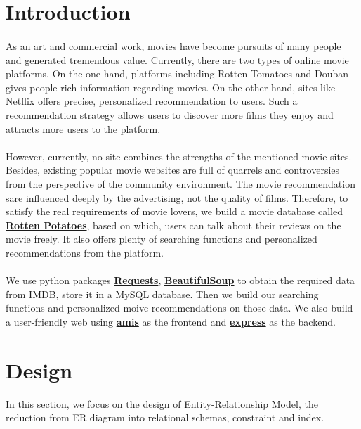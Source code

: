 \begin{CJK*}{UTF8}{gbsn}
\begin{titlepage}
    \vfill
    
\end{titlepage}

\tableofcontents
\pagebreak

\rmfamily
\section{Introduction}
\paragraph{}As an art and commercial work, movies have become pursuits of many people and generated tremendous value. Currently, there are two types of online movie platforms. On the one hand, platforms including Rotten Tomatoes and Douban gives people rich information regarding movies. On the other hand, sites like Netflix offers precise, personalized recommendation to users. Such a recommendation strategy allows users to discover more films they enjoy and attracts more users to the platform.
\paragraph{}However, currently, no site combines the strengths of the mentioned movie sites. Besides, existing popular movie websites are full of quarrels and controversies from the perspective of the community environment. The movie recommendation sare influenced deeply by the advertising, not the quality of films. Therefore, to satisfy the real requirements of movie lovers, we build a movie database called \textbf{\href{http://10.20.9.99:3000}{Rotten Potatoes}}, based on which, users can talk about their reviews on the movie freely. It also offers plenty of searching functions and personalized recommendations from the platform. 
\paragraph{}We use python packages \textbf{\href{https://docs.python-requests.org/en/latest/}{Requests}}, \textbf{\href{https://www.crummy.com/software/BeautifulSoup/bs4/doc/}{BeautifulSoup}} to obtain the required data from IMDB, store it in a MySQL database. Then we build our searching functions and personalized moive recommendations on those data. We also build a user-friendly web using \textbf{\href{https://aisuda.bce.baidu.com/amis/zh-CN/docs/index}{amis}} as the frontend and \textbf{\href{https://expressjs.com}{express}} as the backend.
\section{Design}
In this section, we focus on the design of Entity-Relationship Model, 
the reduction from ER diagram into relational schemas, constraint and index.


\end{CJK*}
